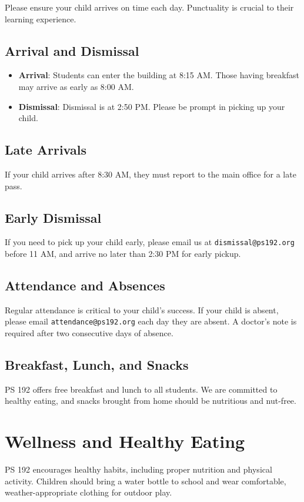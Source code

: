 \documentclass[11pt]{article}
\begin{document}
Please ensure your child arrives on time each day. Punctuality is crucial to their learning experience.

\subsection{Arrival and Dismissal}
\label{sec:orga740e5d}
\begin{itemize}
\item \textbf{\textbf{Arrival}}: Students can enter the building at 8:15 AM. Those having breakfast may arrive as early as 8:00 AM.
\item \textbf{\textbf{Dismissal}}: Dismissal is at 2:50 PM. Please be prompt in picking up your child.
\end{itemize}

\subsection{Late Arrivals}
\label{sec:orgc2fd5b3}
If your child arrives after 8:30 AM, they must report to the main office for a late pass.

\subsection{Early Dismissal}
\label{sec:orgb63c116}
If you need to pick up your child early, please email us at \texttt{dismissal@ps192.org} before 11 AM, and arrive no later than 2:30 PM for early pickup.

\subsection{Attendance and Absences}
\label{sec:orgf871418}
Regular attendance is critical to your child's success. If your child is absent, please email \texttt{attendance@ps192.org} each day they are absent. A doctor's note is required after two consecutive days of absence.

\subsection{Breakfast, Lunch, and Snacks}
\label{sec:org81e076b}
PS 192 offers free breakfast and lunch to all students. We are committed to healthy eating, and snacks brought from home should be nutritious and nut-free.

\section{Wellness and Healthy Eating}
\label{sec:org5f00c98}
PS 192 encourages healthy habits, including proper nutrition and physical activity. Children should bring a water bottle to school and wear comfortable, weather-appropriate clothing for outdoor play.
\end{document}
